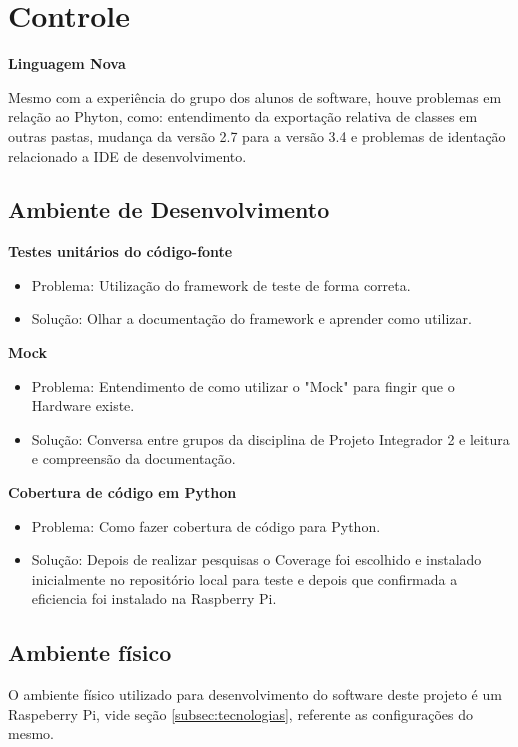 \section{Controle}

  \textbf{Linguagem Nova}

    Mesmo com a experiência do grupo dos alunos de software, houve problemas em relação ao Phyton, como: entendimento da exportação relativa de classes em outras pastas, mudança da versão 2.7 para a versão 3.4 e problemas de identação relacionado a IDE de desenvolvimento.

\subsection{Ambiente de Desenvolvimento}

\textbf{Testes unitários do código-fonte}

    \begin{itemize}
      \item Problema: Utilização do framework de teste de forma correta.
	  \item Solução: Olhar a documentação do framework e aprender como utilizar.

    \end{itemize}

\textbf{Mock}

 \begin{itemize}
      \item Problema: Entendimento de como utilizar o "Mock" para fingir que o Hardware existe.
	  \item Solução: Conversa entre grupos da disciplina de Projeto Integrador 2 e leitura e compreensão da documentação.

    \end{itemize}

\textbf{Cobertura de código em Python}

 \begin{itemize}
      \item Problema: Como fazer cobertura de código para Python.
	  \item Solução: Depois de realizar pesquisas o Coverage foi escolhido e instalado inicialmente no repositório local para teste e depois que confirmada a eficiencia foi instalado na Raspberry Pi.
    \end{itemize}

\subsection{Ambiente físico}
O ambiente físico utilizado para desenvolvimento do software deste projeto é um Raspeberry Pi, vide seção \ref{subsec:tecnologias}, referente as configurações do mesmo.

